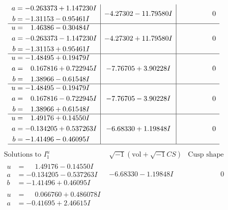 \documentclass[1p]{elsarticle_modified}
\theoremstyle{definition}
\newcommand{\I}{\sqrt{-1}}
\begin{document}
$$\begin{array}{c|c|c}
\begin{aligned}
a &= -0.263373 + 1.147230 I \\
b &= -1.31153 - 0.95461 I\end{aligned}
 & -4.27302 - 11.79580 I & \phantom{-0.000000 } 0 \\ \hline\begin{aligned}
u &= \phantom{-}1.46386 - 0.30484 I \\
a &= -0.263373 - 1.147230 I \\
b &= -1.31153 + 0.95461 I\end{aligned}
 & -4.27302 + 11.79580 I & \phantom{-0.000000 } 0 \\ \hline\begin{aligned}
u &= -1.48495 + 0.19479 I \\
a &= \phantom{-}0.167816 + 0.722945 I \\
b &= \phantom{-}1.38966 - 0.61548 I\end{aligned}
 & -7.76705 + 3.90228 I & \phantom{-0.000000 } 0 \\ \hline\begin{aligned}
u &= -1.48495 - 0.19479 I \\
a &= \phantom{-}0.167816 - 0.722945 I \\
b &= \phantom{-}1.38966 + 0.61548 I\end{aligned}
 & -7.76705 - 3.90228 I & \phantom{-0.000000 } 0 \\ \hline\begin{aligned}
u &= \phantom{-}1.49176 + 0.14550 I \\
a &= -0.134205 + 0.537263 I \\
b &= -1.41496 - 0.46095 I\end{aligned}
 & -6.68330 + 1.19848 I & \phantom{-0.000000 } 0\\
 \hline 
 \end{array}$$\newpage$$\begin{array}{c|c|c}  
\text{Solutions to }I^u_{1}& \I (\text{vol} + \sqrt{-1}CS) & \text{Cusp shape}\\
 \hline 
\begin{aligned}
u &= \phantom{-}1.49176 - 0.14550 I \\
a &= -0.134205 - 0.537263 I \\
b &= -1.41496 + 0.46095 I\end{aligned}
 & -6.68330 - 1.19848 I & \phantom{-0.000000 } 0 \\ \hline\begin{aligned}
u &= \phantom{-}0.066760 + 0.486078 I \\
a &= -0.41695 + 2.46615 I \\

\end{aligned}
\end{array}$$
\end{document}
